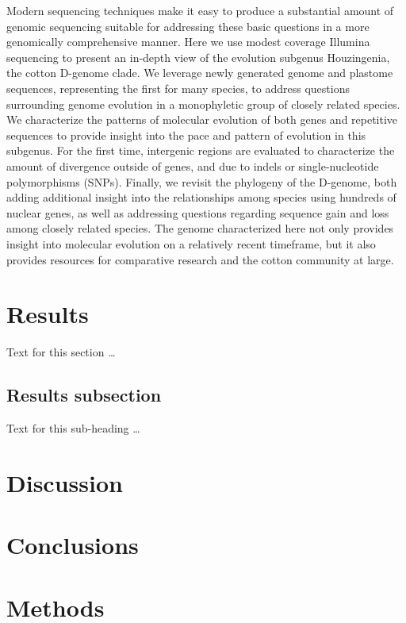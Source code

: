\documentclass{bmcart}
\begin{document}
Modern sequencing techniques make it easy to produce a substantial amount of genomic sequencing suitable for addressing these basic questions in a more genomically comprehensive manner. Here we use modest coverage Illumina sequencing to present an in-depth view of the evolution subgenus Houzingenia, the cotton D-genome clade. We leverage newly generated genome and plastome sequences, representing the first for many species, to address questions surrounding genome evolution in a monophyletic group of closely related species. We characterize the patterns of molecular evolution of both genes and repetitive sequences to provide insight into the pace and pattern of evolution in this subgenus. For the first time, intergenic regions are evaluated to characterize the amount of divergence outside of genes, and due to indels or single-nucleotide polymorphisms (SNPs). Finally, we revisit the phylogeny of the D-genome, both adding additional insight into the relationships among species using hundreds of nuclear genes, as well as addressing questions regarding sequence gain and loss among closely related species. The genome characterized here not only provides insight into molecular evolution on a relatively recent timeframe, but it also provides resources for comparative research and the cotton community at large.


\section*{Results}
Text for this section \ldots
\subsection*{Results subsection}
Text for this sub-heading \ldots

\section*{Discussion}

\section*{Conclusions}

\section*{Methods}
\end{document}
